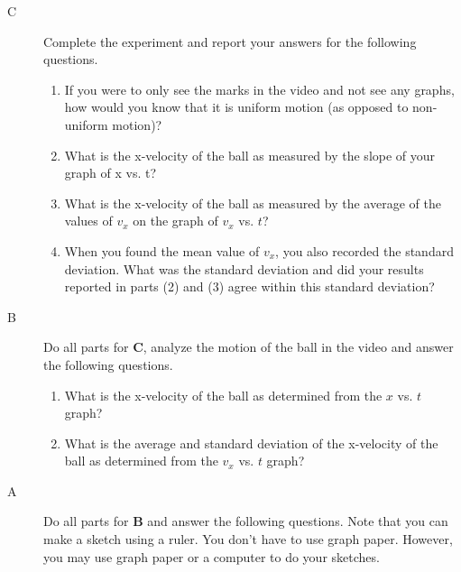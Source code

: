 \begin{description}

\item[C]  Complete the experiment and report your answers for the following questions.

\begin{enumerate}
	 \item If you were to only see the marks in the video and not see any graphs, how would you know that it is uniform motion (as opposed to non-uniform motion)?
	\item What is the x-velocity of the ball as measured by the slope of your graph of x vs. t?
	\item What is the x-velocity of the ball as measured by the average of the values of $v_x$ on the graph of $v_x$ vs. $t$?
	\item When you found the mean value of $v_x$, you also recorded the standard deviation. What was the standard deviation and did your results reported in parts (2) and (3) agree within this standard deviation?
\end{enumerate}

\item[B] Do all parts for {\bf C}, analyze the motion of the ball in the video  and answer the following questions.

\begin{enumerate}
 \item What is the x-velocity of the ball as determined from the $x$ vs. $t$ graph?
 \item What is the average and standard deviation of the x-velocity of the ball as determined from the $v_x$ vs. $t$ graph?
\end{enumerate}

\item[A] Do all parts for {\bf B} and answer the following questions. Note that you can make a sketch using a ruler. You don't have to use graph paper. However, you may use graph paper or a computer to do your sketches.

\begin{enumerate}


\end{enumerate}
\end{description}
